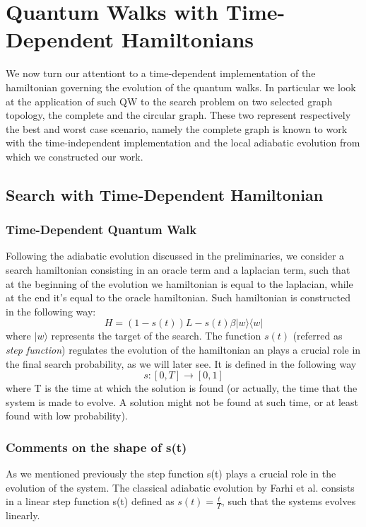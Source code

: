 \newpage
\thispagestyle{empty}
\chapter{Quantum Walks with Time-Dependent Hamiltonians}
We now turn our attentiont to a time-dependent implementation of the hamiltonian governing the evolution of the quantum walks. In particular we look at the application of such QW to the search problem on two selected graph topology, the complete and the circular graph. These two represent respectively the best and worst case scenario, namely the complete graph is known to work with the time-independent implementation \cite{Childs2004} and the local adiabatic evolution \cite{Roland2002} from which we constructed our work.

\section{Search with Time-Dependent Hamiltonian}

    \subsection{Time-Dependent Quantum Walk}
        Following the adiabatic evolution discussed in the preliminaries, we consider a search hamiltonian consisting in an oracle term and a laplacian term, such that at the beginning of the evolution we hamiltonian is equal to the laplacian, while at the end it's equal to the oracle hamiltonian. Such hamiltonian is constructed in the following way:
          \begin{equation}
            H = (1-s(t))L - s(t)\beta|w\rangle\langle w|
          \end{equation}
        where $|w\rangle$ represents the target of the search.
        The function $s(t)$ (referred as \textit{step function}) regulates the evolution of the hamiltonian an plays a  crucial role in the final search probability, as we will later see. It is defined in the following way
          \begin{equation}
            s: [0,T] \rightarrow [0,1]
          \end{equation}
        where T is the time at which the solution is found (or actually, the time that the system is made to evolve. A solution might not be found at such time, or at least found with low probability).


    \subsection{Comments on the shape of s(t)}
        As we mentioned previously the step function s(t) plays a crucial role in the evolution of the system. The classical adiabatic evolution by Farhi et al. \cite{Farhi2000} consists in a linear step function s(t) defined as $s(t) = \frac{t}{T}$, such that the systems evolves linearly. \\


